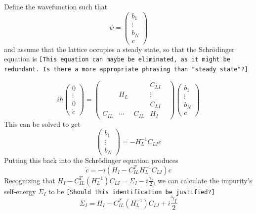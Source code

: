 \documentclass[aps,pra,superscriptaddress,twocolumn]{revtex4-1}
\newcommand{\commentSB}[1]{\texttt{\color{blue}[#1]}}
\begin{document}
Define the wavefunction such that
\begin{equation} \psi = 
\begin{pmatrix}
    b_1 \\ \vdots \\ b_N \\ c
\end{pmatrix} 
\label{eqn:psi}
\end{equation}
and assume that the lattice occupies a steady state, so that the Schr\"odinger equation is
\commentSB{This equation can maybe be eliminated, as it might be redundant. Is there a more appropriate phrasing than "steady state"?}

\begin{equation} i \hbar 
    \begin{pmatrix}
    0 \\ \vdots \\ 0 \\ \dot{c}
    \end{pmatrix} = \begin{pmatrix}
        ~ & ~ & ~ &   C_{LI} \\ 
        ~ & H_L & ~ & \vdots \\
        ~ & ~ & ~ & C_{LI} & \\
        C_{IL} & \cdots & C_{IL} & H_I   
    \end{pmatrix} \begin{pmatrix}
        b_1 \\ \vdots \\ b_N \\ c
    \end{pmatrix} 
\end{equation}
This can be solved to get 
\begin{equation}
    \begin{pmatrix}
        b_1 \\ \vdots \\ b_N
    \end{pmatrix} = - H_L^{-1} C_{LI} c
\end{equation}
Putting this back into the Schr\"odinger equation produces 
\begin{equation}
    \dot{c} = -i (H_I - C_{IL}^T H_L^{-1}C_{LI}) c
\end{equation}
Recognizing that $ H_I - C_{IL}^T (H_L^{-1}) C_{LI} = \Sigma_I - i \frac{\gamma_I}{2} $, we can calculate the impurity's self-energy $\Sigma_I$ to be 
\commentSB{Should this identification be justified?}
\begin{equation}
    \Sigma_I = H_I - C_{IL}^T (H_L^{-1}) C_{LI} + i \frac{\gamma_I}{2}
    \label{eqn:selfenergy}
\end{equation}
\end{document}

